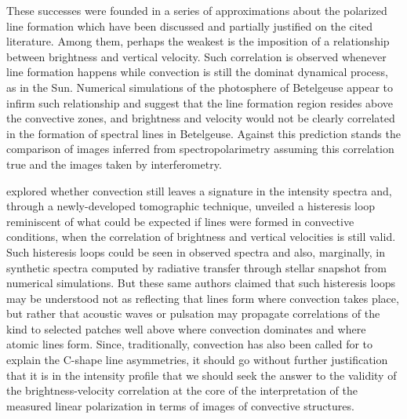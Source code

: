 \documentclass{/Users/art2/TeX/aanda/aa}
\begin{document}
These successes were founded in a series of approximations about the polarized line formation which have been discussed and partially justified 
on the cited literature. Among them, perhaps the weakest is the imposition of a relationship between brightness and vertical velocity. Such correlation 
is observed whenever line formation happens while convection is still the dominat dynamical process, as in the Sun. Numerical simulations of the 
photosphere of Betelgeuse appear to infirm such relationship and suggest that the line formation region resides above the convective zones, and brightness 
and velocity would not be clearly correlated in the formation of spectral lines in Betelgeuse. Against this prediction stands the comparison of 
images inferred from spectropolarimetry assuming this correlation true and the images taken by interferometry. 

\cite{} explored whether convection still leaves a signature in the intensity spectra and, through a newly-developed tomographic technique, unveiled 
a histeresis loop reminiscent of what could be expected if lines were formed in convective conditions, when the correlation of brightness and 
vertical velocities is still valid. Such histeresis loops could be seen in observed spectra and also, marginally, in synthetic spectra computed 
by radiative transfer through stellar snapshot from numerical simulations. But these same authors claimed that such histeresis loops may be understood 
not as reflecting that lines form where convection takes place, but rather that acoustic waves or pulsation may propagate correlations of the 
kind to selected patches well above where convection dominates and where atomic lines form. 
Since, traditionally, convection has also been called for to explain the C-shape line asymmetries, it should go without further justification that 
it is in the intensity profile that we should seek the answer to the validity of the brightness-velocity correlation at the core of the interpretation
of the measured linear polarization in terms of images of convective structures. 
\end{document}
